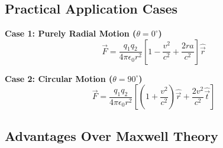 \subsection{Practical Application Cases}

\textbf{Case 1: Purely Radial Motion ($\theta = 0^\circ$)}
\begin{equation}
\vec{F} = \frac{q_1 q_2}{4\pi\epsilon_0 r^2}\left[1 - \frac{v^2}{c^2} + \frac{2r a}{c^2}\right]\hat{\vec{r}}
\end{equation}

\textbf{Case 2: Circular Motion ($\theta = 90^\circ$)}
\begin{equation}
\vec{F} = \frac{q_1 q_2}{4\pi\epsilon_0 r^2}\left[\left(1 + \frac{v^2}{c^2}\right)\hat{\vec{r}} + \frac{2v^2}{c^2}\hat{\vec{t}}\right]
\end{equation}

\subsection{Advantages Over Maxwell Theory}

